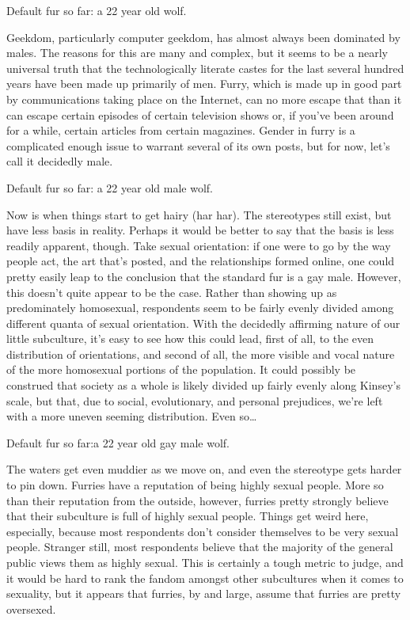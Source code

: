 Default fur so far: a 22 year old wolf.

Geekdom, particularly computer geekdom, has almost always been dominated by males. The reasons for this are many and complex, but it seems to be a nearly universal truth that the technologically literate castes for the last several hundred years have been made up primarily of men. Furry, which is made up in good part by communications taking place on the Internet, can no more escape that than it can escape certain episodes of certain television shows or, if you've been around for a while, certain articles from certain magazines. Gender in furry is a complicated enough issue to warrant several of its own posts, but for now, let's call it decidedly male.

Default fur so far: a 22 year old male wolf.

Now is when things start to get hairy (har har). The stereotypes still exist, but have less basis in reality. Perhaps it would be better to say that the basis is less readily apparent, though. Take sexual orientation: if one were to go by the way people act, the art that's posted, and the relationships formed online, one could pretty easily leap to the conclusion that the standard fur is a gay male. However, this doesn't quite appear to be the case. Rather than showing up as predominately homosexual, respondents seem to be fairly evenly divided among different quanta of sexual orientation. With the decidedly affirming nature of our little subculture, it's easy to see how this could lead, first of all, to the even distribution of orientations, and second of all, the more visible and vocal nature of the more homosexual portions of the population. It could possibly be construed that society as a whole is likely divided up fairly evenly along Kinsey's scale, but that, due to social, evolutionary, and personal prejudices, we're left with a more uneven seeming distribution. Even so\ldots{}

Default fur so far:a 22 year old gay male wolf.

The waters get even muddier as we move on, and even the stereotype gets harder to pin down. Furries have a reputation of being highly sexual people. More so than their reputation from the outside, however, furries pretty strongly believe that their subculture is full of highly sexual people. Things get weird here, especially, because most respondents don't consider themselves to be very sexual people. Stranger still, most respondents believe that the majority of the general public views them as highly sexual. This is certainly a tough metric to judge, and it would be hard to rank the fandom amongst other subcultures when it comes to sexuality, but it appears that furries, by and large, assume that furries are pretty oversexed.

